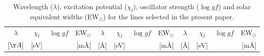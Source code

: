 \documentclass[oldversion]{aa}
\newcommand\T{\rule{0pt}{2.6ex}}
\newcommand\B{\rule[-1.2ex]{0pt}{0pt}}
\begin{document}
\begin{table}[!t]\scriptsize
\centering
\caption[]{Wavelength ($\lambda$), excitation potential ($\chi_l$), oscillator strength ($\log gf$) and solar equivalent widths (EW$_\odot$) for the lines selected in the present paper.}
\label {table:final_list}
  \begin{tabular}{c c r r | c c r r | c c r r}
\hline
\hline
$\lambda$ \T & $\chi_l$ & $\log gf$ & EW$_\odot$  &$\lambda $ & $\chi_l$ & $\log gf$ & EW$_\odot$ &$\lambda $ & $\chi_l$ & $\log gf$ & EW$_\odot$ \\
$[\AA]$ \B & [eV] &  & [m\AA{}] & [\AA] & [eV] &  & [m\AA{}] & [\AA] & [eV] &  & [m\AA{}] \\
\hline


\end{tabular}
\end{table}
\end{document}

